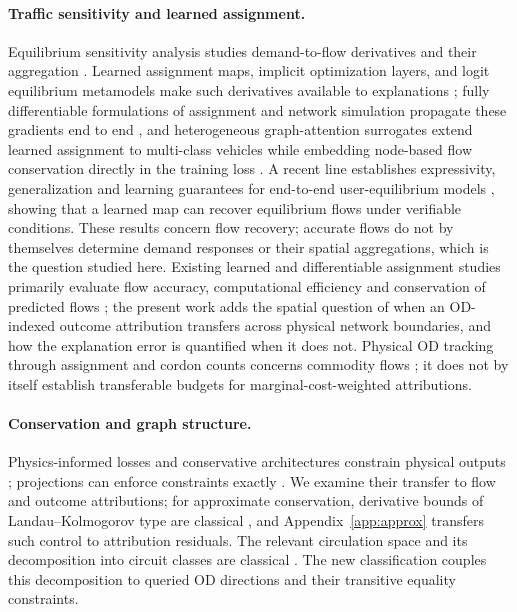 \documentclass[a4paper,fleqn]{cas-sc}
\begin{document}
\paragraph{Traffic sensitivity and learned assignment.}
Equilibrium sensitivity analysis studies demand-to-flow derivatives and
their aggregation
\citep{tobin1988sensitivity,yang2005sensitivity,josefsson2007sensitivity,patriksson2003aggregated}.
Learned assignment maps, implicit optimization layers, and logit
equilibrium metamodels make such derivatives available to explanations
\citep{liu2023endtoend,amos2017optnet,lassen2025learning}; fully
differentiable formulations of assignment and network simulation
propagate these gradients end to end
\citep{li2026differentiable,seo2026differentiable}, and heterogeneous
graph-attention surrogates extend learned assignment to multi-class
vehicles while embedding node-based flow conservation directly in the
training loss \citep{liu2024heterogeneous,liu2025multiclass}. A recent
line establishes expressivity, generalization and learning guarantees
for end-to-end user-equilibrium models \citep{liu2025endtoend},
showing that a learned map can recover equilibrium flows under
verifiable conditions. These results concern flow recovery; accurate
flows do not by themselves determine demand responses or their spatial
aggregations, which is the question studied here. Existing learned and
differentiable assignment studies primarily evaluate flow accuracy,
computational efficiency and conservation of predicted flows
\citep{liu2023endtoend,liu2024heterogeneous,liu2025multiclass,li2026differentiable};
the present work adds the spatial question of when an OD-indexed
outcome attribution transfers across physical network boundaries, and
how the explanation error is quantified when it does not.
Physical OD tracking through assignment and cordon counts concerns
commodity flows \citep{sheffi1985urban,vanzuylen1980most,bar2002origin};
it does not by itself establish transferable budgets for
marginal-cost-weighted attributions.

\paragraph{Conservation and graph structure.}
Physics-informed losses and conservative architectures constrain physical
outputs \citep{raissi2019physics,shi2021physics,richterpowell2022neural};
projections can enforce constraints exactly \citep{valente2025physics,baez2024guaranteeing}.
We examine their transfer to flow and outcome attributions; for
approximate conservation, derivative bounds of Landau--Kolmogorov type
are classical \citep{shadrin2014landau}, and
Appendix~\ref{app:approx} transfers such control to attribution
residuals. The relevant
circulation space and its decomposition into circuit classes are classical
\citep{oxley2011matroid,hopcroft1973algorithm}. The new classification couples
this decomposition to queried OD directions and their transitive equality
constraints.
\end{document}
